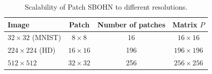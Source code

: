 \begin{table}[h]
\centering
\caption{Scalability of Patch SBOHN to different resolutions.}
\begin{tabular}{lccc}
\hline
\textbf{Image} & \textbf{Patch} & \textbf{Number of patches} & \textbf{Matrix $P$} \\
\hline
$32{\times}32$ (MNIST) & $8{\times}8$ & 16 & $16{\times}16$ \\
$224{\times}224$ (HD) & $16{\times}16$ & 196 & $196{\times}196$ \\
$512{\times}512$ & $32{\times}32$ & 256 & $256{\times}256$ \\
\hline
\end{tabular}
\end{table}
